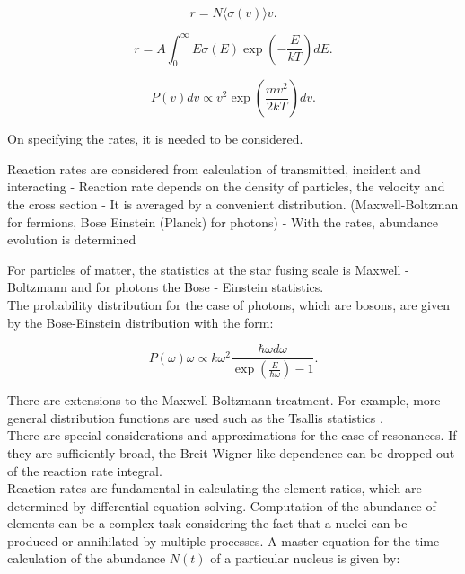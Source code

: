 \documentclass[openany]{book}
\begin{document}
\begin{equation}  \label{eq:reactionRate_generic}
	r = N \langle \sigma (v) \rangle v. 
\end{equation}

\begin{equation}  \label{eq:reactionRate_definition}
	r = A \int_0^{\infty} { E \sigma(E) \exp\left({-\frac{E}{kT}}\right)  dE}.
\end{equation}

\begin{equation} \label{eq:reactionRate_maxwellBoltzmann}
	P(v)dv \propto v^2 \exp{\left({\frac{mv^2}{2kT}}\right)}dv.
\end{equation}

On specifying the rates, it is needed to be considered.

Reaction rates are considered from calculation of transmitted, incident and interacting 
- Reaction rate depends on the density of particles, the velocity and the cross section
-	It is averaged by a convenient distribution. (Maxwell-Boltzman for fermions, Bose Einstein (Planck) for photons)
-	With the rates, abundance evolution is determined 

 For particles of matter, the statistics at the star fusing scale is Maxwell - Boltzmann and for photons the Bose - Einstein statistics. \\ 

The probability distribution for the case of photons, which are bosons, are given by the Bose-Einstein distribution with the form: 

\begin{equation} \label{eq:reactionRate_boseEinstein}
	P(\omega)\omega \propto k \omega^2 \frac{\hbar \omega d\omega}{\exp{(\frac{E}{\hbar\omega})-1}} .
\end{equation}

There are extensions to the Maxwell-Boltzmann treatment. For example, more general distribution functions are used such as the Tsallis statistics \cite{haubold_kumar_2008}.  \\

There are special considerations and approximations for the case of resonances. If they are sufficiently broad, the Breit-Wigner like dependence can be dropped out of the reaction rate integral. \\

 Reaction rates are fundamental in calculating the element ratios, which are determined by differential equation solving. Computation of the abundance of elements can be a complex task considering the fact that a nuclei can be produced or annihilated by multiple processes. A master equation for the time calculation of the abundance $N(t)$ of a particular nucleus is given by:
 
\end{document}
